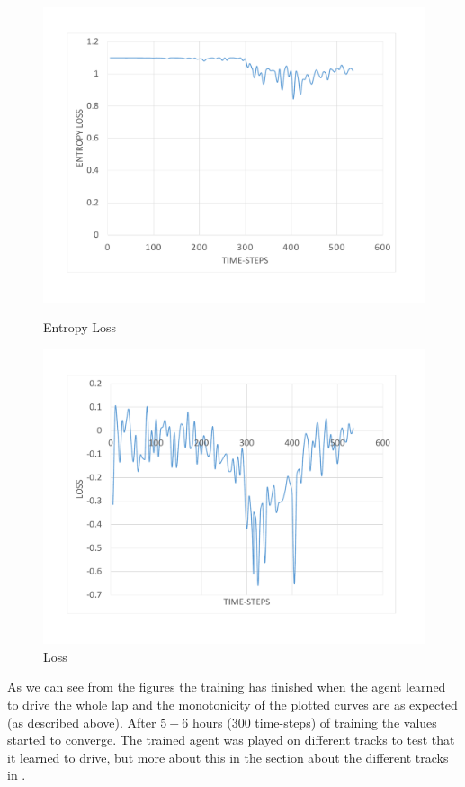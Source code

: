 \begin{figure}[H]
	\advance\leftskip-4cm
	\includegraphics[width=\linewidth]{Figures/EntropyLoss}
	\caption{Entropy Loss}\label{fig:EntropyLoss}
	\endminipage\hfill
	\includegraphics[width=\linewidth]{Figures/Loss}
	\caption{Loss}\label{fig:Loss}
	\endminipage
\end{figure}
As we can see from the figures the training has finished when the agent learned to drive the whole lap and the monotonicity of the plotted curves are as expected (as described above). After $5-6$ hours ($300$ time-steps) of training the values started to converge. The trained agent was played on different tracks to test that it learned to drive, but more about this in the section about the different tracks in .


